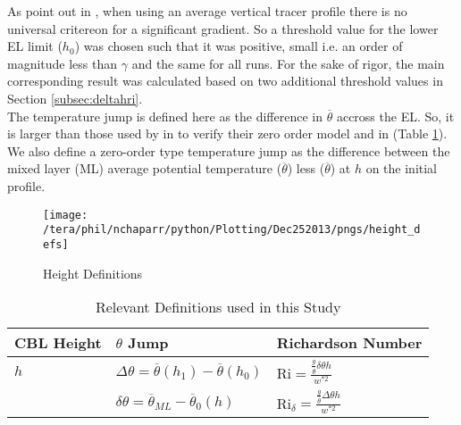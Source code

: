 As \citeauthor{BrooksFowler2} point out in \cite{BrooksFowler2}, when using an average vertical 
tracer profile there is no universal critereon for a significant gradient.  So a threshold value for the
lower \acs{EL} limit ($h_{0}$) was chosen such that it was positive, small i.e. an order of magnitude 
less than $\gamma$ and the same for all runs.  For the sake of rigor, the main corresponding result 
was calculated based on two additional threshold values in Section \ref{subsec:deltahri}.\\

The temperature jump is defined here as the difference in $\overline{\theta}$ accross the \acs{EL}.
So, it is larger than those used by  \citeauthor{FedConzMir04} in \cite{FedConzMir04} to verify 
their zero order model and \citeauthor{SullMoengStev} in \cite{SullMoengStev} (Table \ref{table:reldefs}).
We also define a zero-order type temperature jump as the difference between the mixed layer (\acs{ML}) 
average potential temperature ($\overline{\theta}$) less ($\overline{\theta}$) at $h$ on the initial profile.
\\ 
 
\begin{figure}[htbp]
    \centering
    \texttt{[image: /tera/phil/nchaparr/python/Plotting/Dec252013/pngs/height\_defs]}
    \caption{Height Definitions}
    \label{fig:hdefs}   %
\end{figure}

\begin{table}[htbp]
    \begin{tabular}{p{4cm}p{4cm}p{4cm}}
    \hline
      CBL Height & $\theta$ Jump & Richardson Number   \\ \hline 
      $h$ & $\Delta \theta = \overline{\theta}(h_{1}) - \overline{\theta}(h_{0})$ & \acs{Ri}$=\frac{\frac{g}{\overline{\theta}} \delta \theta h}{w^{*2}}$\\
          & $\delta \theta = \overline{\theta}_{ML}-\overline{\theta}_{0}(h)$ & \acs{Ri}$_{\delta}=\frac{\frac{g}{\overline{\theta}} \Delta \theta h}{w^{*2}}$\\ \hline      
    \end{tabular}
\caption{Relevant Definitions used in this Study}
\label{table:reldefs}   
\end{table}

